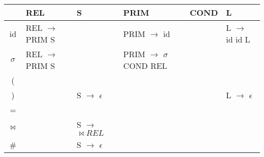 \documentclass{article}
\begin{document}

\begin{tabularx}{15cm}{|c|p{4cm}|X|X|X|X|}
    \hline
     & REL & S & PRIM & COND & L \\
    \hline
    id & REL $\rightarrow$ PRIM S & & PRIM $\rightarrow$ id & & L $\rightarrow$ id id L \\
    \hline
    $\sigma$ & REL $\rightarrow$ PRIM S & & PRIM $\rightarrow$ $\sigma$ COND REL & & \\
    \hline
    ( & & & & & \\
    \hline
    ) & & S $\rightarrow$ $\epsilon$ & & & L $\rightarrow$ $\epsilon$ \\
    \hline
    = & & & & & \\
    \hline
    $\bowtie$ & & S $\rightarrow$ $\bowtie REL$ & & & \\
    \hline
    \# & & S $\rightarrow$ $\epsilon$ & & & \\
    \hline
\end{tabularx}
\end{document}
